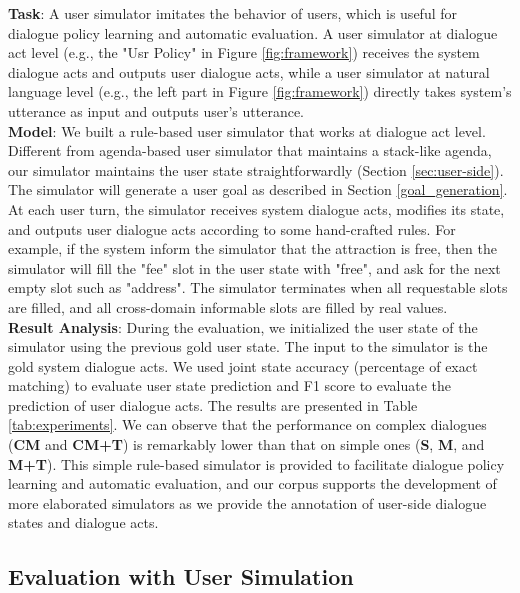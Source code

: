 \textbf{Task}:
A user simulator imitates the behavior of users, which is useful for dialogue policy learning and automatic evaluation. 
A user simulator at dialogue act level (e.g., the "Usr Policy" in Figure \ref{fig:framework}) receives the system dialogue acts and outputs user dialogue acts, while a user simulator at natural language level (e.g., the left part in Figure \ref{fig:framework}) directly takes system's utterance as input and outputs user's utterance.\\

\noindent\textbf{Model}:
We built a rule-based user simulator that works at dialogue act level. Different from agenda-based \cite{agenda2007schatzmann} user simulator that maintains a stack-like agenda, our simulator maintains the user state straightforwardly (Section \ref{sec:user-side}). 
The simulator will generate a user goal as described in Section \ref{goal_generation}. 
At each user turn, the simulator receives system dialogue acts, modifies its state, and outputs user dialogue acts according to some hand-crafted rules.
For example, if the system inform the simulator that the attraction is free, then the simulator will fill the "fee" slot in the user state with "free", and ask for the next empty slot such as "address".
The simulator terminates when all requestable slots are filled, and all cross-domain informable slots are filled by real values. \\

\noindent\textbf{Result Analysis}:
During the evaluation, we initialized the user state of the simulator using the previous gold user state. The input to the simulator is the gold system dialogue acts. We used joint state accuracy (percentage of exact matching) to evaluate user state prediction and F1 score to evaluate the prediction of user dialogue acts. 
The results are presented in Table \ref{tab:experiments}. 
We can observe that the performance on complex dialogues (\textbf{CM} and \textbf{CM+T}) is remarkably lower than that on simple ones (\textbf{S}, \textbf{M}, and \textbf{M+T}). This simple rule-based simulator is provided to facilitate dialogue policy learning and automatic evaluation, and our corpus supports the development of more elaborated simulators as we provide the annotation of user-side dialogue states and dialogue acts.

\subsection{Evaluation with User Simulation}

